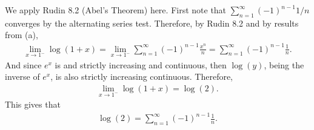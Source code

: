 \documentclass[12pt]{article}
\begin{document}
\begin{fproof}[1(b)]
We apply Rudin 8.2 (Abel's Theorem) here.
First note that \(\sum_{n=1}^{\infty} (-1)^{n-1}1/n\) converges by the alternating series test.
Therefore, by Rudin 8.2 and by results from (a),
\begin{align*}
    \lim_{x \to 1^-} \log(1+x) = \lim_{x \to 1^-} \sum_{n=1}^{\infty} (-1)^{n-1} \frac{x^n}{n}=  \sum_{n=1}^{\infty} (-1)^{n-1} \frac{1}{n}.
\end{align*}
And since \(e^x\) is and strictly increasing and continuous, then \(\log(y)\), being the inverse of \(e^x\), is also strictly increasing continuous. Therefore,
\begin{align*}
    \lim_{x \to 1^-} \log(1+x) = \log(2).
\end{align*}
This gives that
\begin{align*}
    \log(2) = \sum_{n=1}^{\infty} (-1)^{n-1} \frac{1}{n}. 
\end{align*}
\end{fproof}
\newpage

\begin{fproof}[2]

\end{fproof}
\newpage

\begin{fproof}[3(a)]
  
\end{fproof}

\begin{fproof}[3(b)]
  
\end{fproof}

\begin{fproof}[3(c)]
  
\end{fproof}
\newpage

\begin{fproof}[4]

\end{fproof}
\newpage

\begin{fproof}[5(a)]

\end{fproof}

\begin{fproof}[5(b)]

\end{fproof}

\begin{fproof}[5(c)]

\end{fproof}
\end{document}
